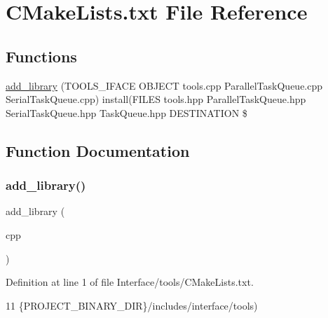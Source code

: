 \hypertarget{Interface_2tools_2CMakeLists_8txt}{}\section{C\+Make\+Lists.\+txt File Reference}
\label{Interface_2tools_2CMakeLists_8txt}
\subsection*{Functions}
\begin{DoxyCompactItemize}
\item 
\hyperlink{Interface_2tools_2CMakeLists_8txt_a0ce3217fef9c2b9a0d23a3b8db43f787}{add\+\_\+library} (T\+O\+O\+L\+S\+\_\+\+I\+F\+A\+CE O\+B\+J\+E\+CT tools.\+cpp Parallel\+Task\+Queue.\+cpp Serial\+Task\+Queue.\+cpp) install(F\+I\+L\+ES tools.\+hpp Parallel\+Task\+Queue.\+hpp Serial\+Task\+Queue.\+hpp Task\+Queue.\+hpp D\+E\+S\+T\+I\+N\+A\+T\+I\+ON \$
\end{DoxyCompactItemize}


\subsection{Function Documentation}
\mbox{\label{Interface_2tools_2CMakeLists_8txt_a0ce3217fef9c2b9a0d23a3b8db43f787}} 
\subsubsection{\texorpdfstring{add\+\_\+library()}{add\_library()}}
{\footnotesize\ttfamily add\+\_\+library (\begin{DoxyParamCaption}\item[{T\+O\+O\+L\+S\+\_\+\+I\+F\+A\+CE O\+B\+J\+E\+CT tools.\+cpp Parallel\+Task\+Queue.\+cpp Serial\+Task\+Queue.}]{cpp }\end{DoxyParamCaption})}



Definition at line 1 of file Interface/tools/\+C\+Make\+Lists.\+txt.


\begin{DoxyCode}
11                \{PROJECT\_BINARY\_DIR\}/includes/interface/tools)
\end{DoxyCode}
